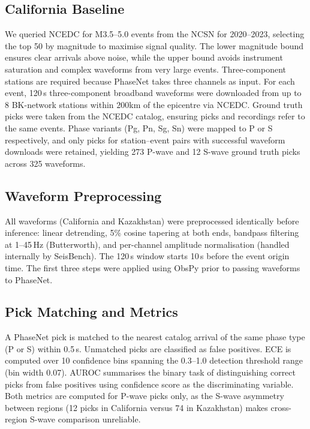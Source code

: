 \subsection{California Baseline}
\label{app:california}

We queried NCEDC for M3.5--5.0 events from the NCSN for 2020--2023, selecting the 
top 50 by magnitude to maximise signal quality. The lower magnitude bound ensures 
clear arrivals above noise, while the upper bound avoids instrument saturation and complex 
waveforms from very large events. Three-component stations are required because 
PhaseNet takes three channels as input. For each event, 120\,s three-component 
broadband waveforms were downloaded from up to 8 BK-network stations within 
$200$km of the epicentre via NCEDC. Ground truth picks were taken from the NCEDC 
catalog, ensuring picks and recordings refer to the same events. Phase variants 
(Pg, Pn, Sg, Sn) were mapped to P or S respectively, and only picks for 
station--event pairs with successful waveform downloads were retained, yielding 273 
P-wave and 12 S-wave ground truth picks across 325 waveforms.

\subsection{Waveform Preprocessing}
\label{app:preprocessing}

All waveforms (California and Kazakhstan) were preprocessed identically before 
inference: linear detrending, 5\% cosine tapering at both ends, bandpass filtering 
at 1--45\,Hz (Butterworth), and per-channel amplitude normalisation (handled 
internally by SeisBench). The 120\,s window starts 10\,s before the event origin 
time. The first three steps were applied using ObsPy prior to passing waveforms 
to PhaseNet.

\subsection{Pick Matching and Metrics}
\label{app:matching}

A PhaseNet pick is matched to the nearest catalog arrival of the same phase type 
(P or S) within 0.5\,s. Unmatched picks are classified as false positives. ECE is 
computed over 10 confidence bins spanning the 0.3--1.0 detection threshold range 
(bin width 0.07). AUROC summarises the binary task of distinguishing correct picks 
from false positives using confidence score as the discriminating variable. Both 
metrics are computed for P-wave picks only, as the S-wave asymmetry between regions 
(12 picks in California versus 74 in Kazakhstan) makes cross-region S-wave comparison 
unreliable.


